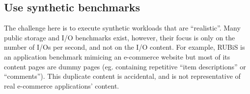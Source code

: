 \subsection{Use synthetic benchmarks}
The challenge here is to execute synthetic workloads that are ``realistic''.
Many public storage and I/O benchmarks exist, however, their
focus is only on the number of I/Os per second, and not on the I/O content.
For example, RUBiS is an application benchmark mimicing
an e-commerce website but most of its content pages are dummy pages (eg.
containing repetitive ``item descriptions'' or ``comments''). 
This duplicate content is accidental, and is not
representative of real e-commerce applications' content.

